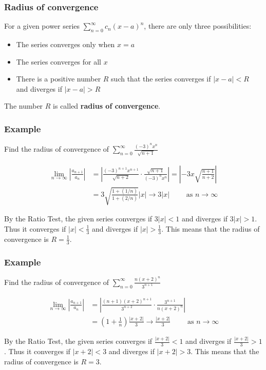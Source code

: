 \documentclass[t]{beamer}
\theoremstyle{plain}
\theoremstyle{definition}
\newcommand{\limm}[1]{\displaystyle \lim_{n\to #1}}
\begin{document}
\begin{frame}

\frametitle{Radius of convergence}

For a given power series $\sum_{n=0}^{\infty} c_n (x - a)^n$, there are only three possibilities:

\begin{itemize}
	\item The series converges only when $x = a$
	\item The series converges for all $x$
	\item There is a positive number $R$ such that the series converges if $|x - a| < R$ and diverges if $|x - a| > R$
\end{itemize}

The number $R$ is called \textbf{radius of convergence}. 

\end{frame}

\begin{frame}

\frametitle{Example}

Find the radius of convergence of $\sum_{n=0}^{\infty} \frac{(-3)^nx^n}{\sqrt{n + 1}}$ \pause

\begin{align*}
\limm{\infty}\left|\frac{a_{n+1}}{a_n}\right| &=  \left| \frac{(-3)^{n + 1} x^{n + 1}}{\sqrt{n + 2}} \cdot \frac{\sqrt{n + 1}}{(-3)^n x^n}\right| = \left| -3x \sqrt{\frac{n + 1}{n + 2}}\right|\\
&= 3 \sqrt{\frac{1 + (1/n)}{1 + (2/n)}} |x| \rightarrow 3 |x| \qquad \text{ as } n \rightarrow \infty
\end{align*}

By the Ratio Test, the given series converges if $3 |x| < 1$ and diverges if $3 |x| > 1$.  Thus it converges if $|x| < \frac{1}{3}$ and diverges if $|x| > \frac{1}{3}$.  This means that the radius of convergence is $R = \frac{1}{3}$.

\end{frame}

\begin{frame}

\frametitle{Example}

Find the radius of convergence of $\displaystyle\sum_{n=0}^{\infty} \frac{n(x + 2)^n}{3^{n + 1}}$ \pause

\begin{align*}
\limm{\infty}\left|\frac{a_{n+1}}{a_n}\right| &= \left| \frac{(n + 1)(x + 2)^{n + 1}}{3^{n + 2}} \cdot \frac{3^{n + 1}}{n(x + 2)^n}\right|\\
&= \left(  1 + \frac{1}{n}  \right) \frac{|x + 2|}{3} \rightarrow \frac{|x + 2|}{3} \qquad \text{ as } n \rightarrow \infty
\end{align*}

By the Ratio Test, the given series converges if $\frac{|x + 2|}{3}< 1$ and diverges if $\frac{|x + 2|}{3} > 1$.  Thus it converges if $|x + 2| < 3$ and diverges if $|x + 2| > 3$.  This means that the radius of convergence is $R = 3$.

\end{frame}
\end{document}
